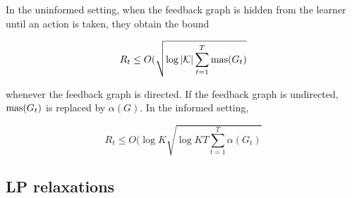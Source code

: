 In the uninformed setting, when the feedback graph is hidden from the learner until an action is taken, they obtain the bound

$$R_t\leq O(\sqrt{\log |\mathcal{K}|\sum_{t=1}^T\text{mas}(G_t)}$$

whenever the feedback graph is directed. If the feedback graph is undirected, $\text{mas}(G_t)$ is replaced by $\alpha(G)$. In the informed setting, 

$$R_t \leq O(\log K\sqrt{\log KT\sum_{t=1}^T\alpha(G_t)}$$

\subsection{LP relaxations}

